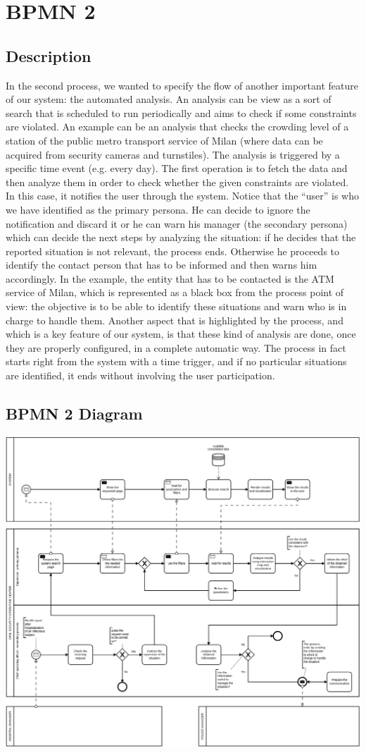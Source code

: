 \documentclass[../main.tex]{subfiles}
\begin{document}
    \chapter{BPMN 2}\label{ch:bpmn-2}
    \section{Description}\label{sec:description}
    In the second process, we wanted to specify the flow of another important feature of our system: the automated analysis. An analysis can be view as a sort of search that is scheduled to run periodically and aims to check if some constraints are violated.
    An example can be an analysis that checks the crowding level of a station of the public metro transport service of Milan (where data can be acquired from security cameras and turnstiles).
    The analysis is triggered by a specific time event (e.g. every day). The first operation is to fetch the data and then analyze them in order to check whether the given constraints are violated. In this case, it notifies the user through the system. Notice that the “user” is who we have identified as the primary persona. He can decide to ignore the notification and discard it or he can warn his manager (the secondary persona) which can decide the next steps by analyzing the situation: if he decides that the reported situation is not relevant, the process ends.
    Otherwise he proceeds to identify the contact person that has to be informed and then warns him accordingly. In the example, the entity that has to be contacted is the ATM service of Milan, which is represented as a black box from the process point of view: the objective is to be able to identify these situations and warn who is in charge to handle them.
    Another aspect that is highlighted by the process, and which is a key feature of our system, is that these kind of analysis are done, once they are properly configured, in a complete automatic way. The process in fact starts right from the system with a time trigger, and if no particular situations are identified, it ends without involving the user participation.

    \section{BPMN 2 Diagram}\label{sec:bpmn-2-diagram}
    \includegraphics[scale = 0.45]{assets/bpmn2.png}
\end{document}
